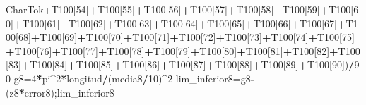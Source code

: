 \documentclass[
]{article}
\newenvironment{Shaded}{\begin{snugshade}}{\end{snugshade}}
\newcommand{\DecValTok}[1]{\textcolor[rgb]{0.00,0.00,0.81}{#1}}
\newcommand{\NormalTok}[1]{#1}
\newcommand{\OtherTok}[1]{\textcolor[rgb]{0.56,0.35,0.01}{#1}}
\newcommand{\SpecialCharTok}[1]{\textcolor[rgb]{0.81,0.36,0.00}{\textbf{#1}}}
\begin{document}
\begin{Shaded}
\begin{Highlighting}[]
CharTok{+}\NormalTok{T100[}\DecValTok{54}\NormalTok{]}\SpecialCharTok{+}\NormalTok{T100[}\DecValTok{55}\NormalTok{]}\SpecialCharTok{+}\NormalTok{T100[}\DecValTok{56}\NormalTok{]}\SpecialCharTok{+}\NormalTok{T100[}\DecValTok{57}\NormalTok{]}\SpecialCharTok{+}\NormalTok{T100[}\DecValTok{58}\NormalTok{]}\SpecialCharTok{+}\NormalTok{T100[}\DecValTok{59}\NormalTok{]}\SpecialCharTok{+}\NormalTok{T100[}\DecValTok{60}\NormalTok{]}\SpecialCharTok{+}\NormalTok{T100[}\DecValTok{61}\NormalTok{]}\SpecialCharTok{+}\NormalTok{T100[}\DecValTok{62}\NormalTok{]}\SpecialCharTok{+}\NormalTok{T100[}\DecValTok{63}\NormalTok{]}\SpecialCharTok{+}\NormalTok{T100[}\DecValTok{64}\NormalTok{]}\SpecialCharTok{+}\NormalTok{T100[}\DecValTok{65}\NormalTok{]}\SpecialCharTok{+}\NormalTok{T100[}\DecValTok{66}\NormalTok{]}\SpecialCharTok{+}\NormalTok{T100[}\DecValTok{67}\NormalTok{]}\SpecialCharTok{+}\NormalTok{T100[}\DecValTok{68}\NormalTok{]}\SpecialCharTok{+}\NormalTok{T100[}\DecValTok{69}\NormalTok{]}\SpecialCharTok{+}\NormalTok{T100[}\DecValTok{70}\NormalTok{]}\SpecialCharTok{+}\NormalTok{T100[}\DecValTok{71}\NormalTok{]}\SpecialCharTok{+}\NormalTok{T100[}\DecValTok{72}\NormalTok{]}\SpecialCharTok{+}\NormalTok{T100[}\DecValTok{73}\NormalTok{]}\SpecialCharTok{+}\NormalTok{T100[}\DecValTok{74}\NormalTok{]}\SpecialCharTok{+}\NormalTok{T100[}\DecValTok{75}\NormalTok{]}\SpecialCharTok{+}\NormalTok{T100[}\DecValTok{76}\NormalTok{]}\SpecialCharTok{+}\NormalTok{T100[}\DecValTok{77}\NormalTok{]}\SpecialCharTok{+}\NormalTok{T100[}\DecValTok{78}\NormalTok{]}\SpecialCharTok{+}\NormalTok{T100[}\DecValTok{79}\NormalTok{]}\SpecialCharTok{+}\NormalTok{T100[}\DecValTok{80}\NormalTok{]}\SpecialCharTok{+}\NormalTok{T100[}\DecValTok{81}\NormalTok{]}\SpecialCharTok{+}\NormalTok{T100[}\DecValTok{82}\NormalTok{]}\SpecialCharTok{+}\NormalTok{T100[}\DecValTok{83}\NormalTok{]}\SpecialCharTok{+}\NormalTok{T100[}\DecValTok{84}\NormalTok{]}\SpecialCharTok{+}\NormalTok{T100[}\DecValTok{85}\NormalTok{]}\SpecialCharTok{+}\NormalTok{T100[}\DecValTok{86}\NormalTok{]}\SpecialCharTok{+}\NormalTok{T100[}\DecValTok{87}\NormalTok{]}\SpecialCharTok{+}\NormalTok{T100[}\DecValTok{88}\NormalTok{]}\SpecialCharTok{+}\NormalTok{T100[}\DecValTok{89}\NormalTok{]}\SpecialCharTok{+}\NormalTok{T100[}\DecValTok{90}\NormalTok{])}\SpecialCharTok{/}\DecValTok{90}
\NormalTok{g8}\OtherTok{=}\DecValTok{4}\SpecialCharTok{*}\NormalTok{pi}\SpecialCharTok{\^{}}\DecValTok{2}\SpecialCharTok{*}\NormalTok{longitud}\SpecialCharTok{/}\NormalTok{(media8}\SpecialCharTok{/}\DecValTok{10}\NormalTok{)}\SpecialCharTok{\^{}}\DecValTok{2}
\NormalTok{lim\_inferior8}\OtherTok{=}\NormalTok{g8}\SpecialCharTok{{-}}\NormalTok{(z8}\SpecialCharTok{*}\NormalTok{error8);lim\_inferior8}
\end{Highlighting}
\end{Shaded}
\end{document}
